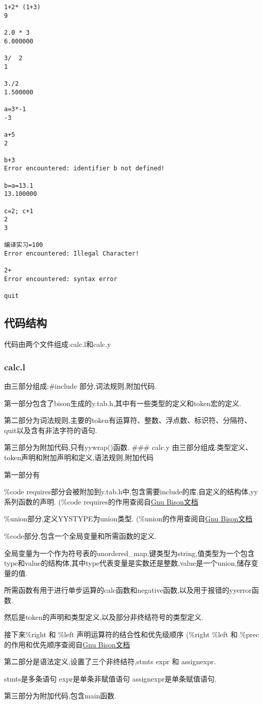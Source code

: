 \begin{verbatim}
1+2* (1+3)
9

2.0 * 3
6.000000

3/  2
1

3./2
1.500000

a=3*-1
-3

a+5
2

b+3
Error encountered: identifier b not defined!

b=a=13.1
13.100000

c=2; c+1
2
3

编译实习=100
Error encountered: Illegal Character!

2+
Error encountered: syntax error

quit
\end{verbatim}

\hypertarget{ux4ee3ux7801ux7ed3ux6784}{%
\subsection{代码结构}\label{ux4ee3ux7801ux7ed3ux6784}}

代码由两个文件组成:calc.l和calc.y

\hypertarget{calc.l}{%
\subsubsection{calc.l}\label{calc.l}}

由三部分组成:\#include 部分,词法规则,附加代码.

第一部分包含了bison生成的y.tab.h,其中有一些类型的定义和token宏的定义.

第二部分为词法规则,主要的token有运算符、整数、浮点数、标识符、分隔符、quit以及含有非法字符的语句.

第三部分为附加代码,只有yywrap()函数. \#\#\# calc.y
由三部分组成:类型定义、token声明和附加声明和定义,语法规则,附加代码

第一部分有

\%code
requires部分会被附加到y.tab.h中,包含需要include的库,自定义的结构体,yy系列函数的声明.
(\%code
requires的作用查阅自\href{http://www.gnu.org/software/bison/manual/bison.html}{Gnu
Bison文档}

\%union部分,定义YYSTYPE为union类型.
(\%union的作用查阅自\href{http://www.gnu.org/software/bison/manual/bison.html}{Gnu
Bison文档}

\%code部分,包含一个全局变量和所需函数的定义.

全局变量为一个作为符号表的unordered\_map,键类型为string,值类型为一个包含type和value的结构体,其中type代表变量是实数还是整数,value是一个union,储存变量的值.

所需函数有用于进行单步运算的calc函数和negative函数,以及用于报错的yyerror函数.

然后是token的声明和类型定义,以及部分非终结符号的类型定义.

接下来\%right 和 \%left 声明运算符的结合性和优先级顺序 (\%right \%left
和 \%prec
的作用和优先顺序查阅自\href{http://www.gnu.org/software/bison/manual/bison.html}{Gnu
Bison文档}

第二部分是语法定义,设置了三个非终结符,stmts expr 和 assignexpr.

stmts是多条语句 expr是单条非赋值语句 assignexpr是单条赋值语句.

第三部分为附加代码,包含main函数.
